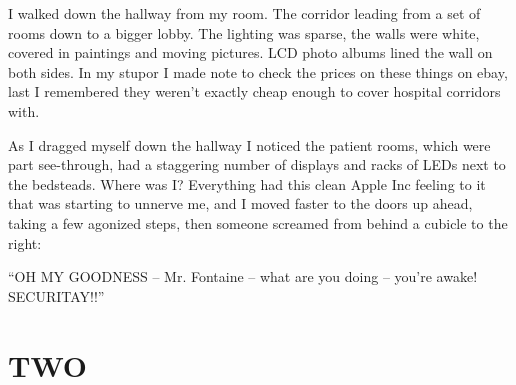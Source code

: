 I walked down the hallway from my room. The corridor leading from a set of rooms down to a bigger lobby. The lighting was sparse, the walls were white, covered in paintings and moving pictures. LCD photo albums lined the wall on both sides.
In my stupor I made note to check the prices on these things on ebay, last I remembered they weren't exactly cheap enough to cover hospital corridors with.

As I dragged myself down the hallway I noticed the patient rooms, which were part see-through, had a staggering number of displays and racks of LEDs next to the bedsteads. Where was I? Everything had this clean Apple Inc feeling to it that was starting to unnerve me, and I moved faster to the doors up ahead, taking a few agonized steps, then someone screamed from behind a cubicle to the right:

``OH MY GOODNESS -- Mr. Fontaine -- what are you doing -- you're awake! SECURITAY!!''
\chapter*{TWO}



